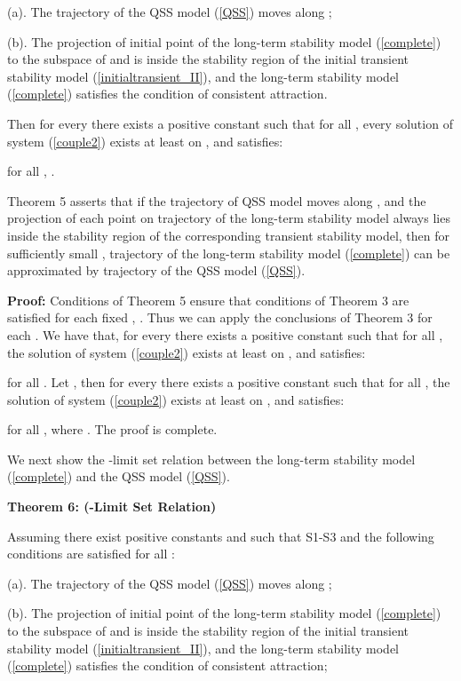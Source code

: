 \documentclass[journal]{IEEEtran}
\begin{document}
(a). The trajectory  of the QSS model (\ref{QSS}) moves along ;

(b). The projection of initial point  of the long-term stability model (\ref{complete}) to the subspace of  and  is inside the stability region  of the initial transient stability model (\ref{initialtransient_II}), and the long-term stability model (\ref{complete}) satisfies the condition of consistent attraction.

Then for every  there exists a positive constant  such that for all , every solution  of system (\ref{couple2}) exists at least on , and satisfies:

for all , .

Theorem 5 asserts that if the trajectory of QSS model moves along , and the projection of each point on trajectory of the long-term stability model always lies inside the stability region of the corresponding transient stability model, then for sufficiently small , trajectory of the long-term stability model (\ref{complete}) can be approximated by trajectory of the QSS model (\ref{QSS}).

\noindent\textbf{Proof:}
Conditions of Theorem 5 ensure that conditions of Theorem 3 are satisfied for each fixed , . Thus we can apply the conclusions of Theorem 3 for each . We have that, for every  there exists a positive constant  such that for all , the solution  of system (\ref{couple2}) exists at least on , and satisfies:

for all . Let , then for every  there exists a positive constant  such that for all , the solution  of system (\ref{couple2}) exists at least on , and satisfies:

for all , where .
The proof is complete.

We next show the -limit set relation between the long-term stability model (\ref{complete}) and the QSS model (\ref{QSS}).

\noindent\textbf{Theorem 6: (-Limit Set Relation)}

Assuming there exist positive constants  and  such that S1-S3 and the following conditions are satisfied for all :

(a). The trajectory  of the QSS model (\ref{QSS}) moves along ;

(b). The projection of initial point  of the long-term stability model (\ref{complete}) to the subspace of  and  is inside the stability region  of the initial transient stability model (\ref{initialtransient_II}), and the long-term stability model (\ref{complete}) satisfies the condition of consistent attraction;
\end{document}
